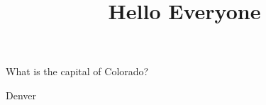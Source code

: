 \documentclass{ximera}
\title{Hello Everyone}
\begin{document}
\begin{question}
What is the capital of Colorado?
\begin{solution}
Denver
\end{solution}
\end{question}
\end{document}
